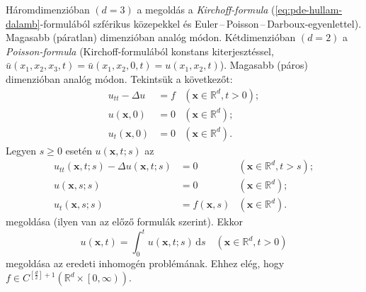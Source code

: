 \documentclass[DIV=15,appendixprefix]{scrreprt}
\theoremstyle{definition}
\theoremstyle{remark}
\begin{document}
Háromdimenzióban $ \left( d = 3 \right) $ a megoldás a \emph{Kirchoff-formula}
(\ref{eq:pde-hullam-dalamb}-formulából szférikus közepekkel és
Euler\,--\,Poisson\,--\,Darboux-egyenlettel). Magasabb (páratlan) dimenzióban analóg módon.
%
Kétdimenzióban $ \left( d = 2 \right) $ a \emph{Poisson-formula} (Kirchoff-formulából konstans
kiterjesztéssel, $ \bar{u} \left( x_{ 1 },{} x_{ 2 },{} x_{ 3 },{} t \right) = \bar{u} \left(
x_{ 1 },{} x_{ 2 },{} 0,{} t \right) = u \left( x_{ 1 },{} x_{ 2 },{} t \right) $). Magasabb (páros) dimenzióban analóg módon.
%
Tekintsük a következőt:
\begin{equation*}
	\begin{aligned}
		u_{ tt } - \Delta u 						&= f 	&
			\left( \mathbf{ x } \in \mathbb{ R }^{ d },{} t > 0 \right);\\
		u \left( \mathbf{ x },{} 0 \right) 			&= 0 	&
			\left( \mathbf{ x } \in \mathbb{ R }^{ d } \right);\\
		u_{ t } \left( \mathbf{ x },{} 0 \right) 	&= 0 	&
			\left( \mathbf{ x } \in \mathbb{ R }^{ d } \right).
	\end{aligned}
\end{equation*}
Legyen $ s \ge 0 $ esetén $ u \left( \mathbf{ x },{} t;{} s \right) $ az
\begin{equation*}
	\begin{aligned}
		u_{ tt } \left( \mathbf{ x },{} t;{} s \right) - \Delta u \left( \mathbf{ x },{} t;{} s \right)											&= 0 									&
			\left( \mathbf{ x } \in \mathbb{ R }^{ d },{} t > s \right);\\
		u \left( \mathbf{ x },{} s;{} s \right) 		&= 0 									&
			\left( \mathbf{ x } \in \mathbb{ R }^{ d } \right);\\
		u_{ t } \left( \mathbf{ x },{} s;{} s \right) 	&= f \left( \mathbf{ x },{} s \right) 	&
			\left( \mathbf{ x } \in \mathbb{ R }^{ d } \right).
	\end{aligned}
\end{equation*}
megoldása (ilyen van az előző formulák szerint). Ekkor
\begin{equation*}
	u \left( \mathbf{ x },{} t \right) = \int_{ 0 }^{ t } u \left( \mathbf{ x },{} t;{} s \right) \,
	\mathrm{ d } s \quad \left( \mathbf{ x } \in \mathbb{ R }^{ d },{} t > 0 \right)
\end{equation*}
megoldása az eredeti inhomogén problémának. Ehhez elég, hogy $ f \in C^{ \left[ \frac{ d }{ 2 } \right] + 1 } \left( \mathbb{ R }^{ d } \times \left.\left[ 0,{} \infty \right)\right. \right) $.
%
\end{document}
